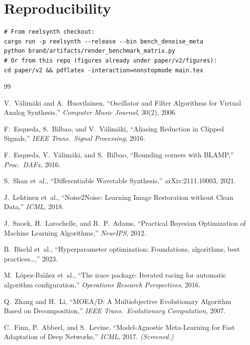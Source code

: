 \documentclass[11pt,a4paper]{article}
\begin{document}
\section*{Reproducibility}
\begin{verbatim}
# From reelsynth checkout:
cargo run -p reelsynth --release --bin bench_denoise_meta
python brand/artifacts/render_benchmark_matrix.py
# Or from this repo (figures already under paper/v2/figures):
cd paper/v2 && pdflatex -interaction=nonstopmode main.tex
\end{verbatim}

\begin{thebibliography}{99}

V.~V\"alim\"aki and A.~Huovilainen,
``Oscillator and Filter Algorithms for Virtual Analog Synthesis,''
\emph{Computer Music Journal}, 30(2), 2006.

F.~Esqueda, S.~Bilbao, and V.~V\"alim\"aki,
``Aliasing Reduction in Clipped Signals,''
\emph{IEEE Trans.\ Signal Processing}, 2016.

F.~Esqueda, V.~V\"alim\"aki, and S.~Bilbao,
``Rounding corners with BLAMP,''
\emph{Proc.\ DAFx}, 2016.

S.~Shan et~al.,
``Differentiable Wavetable Synthesis,''
arXiv:2111.10003, 2021.

J.~Lehtinen et~al.,
``Noise2Noise: Learning Image Restoration without Clean Data,''
\emph{ICML}, 2018.

J.~Snoek, H.~Larochelle, and R.~P.~Adams,
``Practical Bayesian Optimization of Machine Learning Algorithms,''
\emph{NeurIPS}, 2012.

B.~Bischl et~al.,
``Hyperparameter optimization: Foundations, algorithms, best practices\ldots,''
2023.

M.~L\'opez-Ib\'a\~nez et~al.,
``The irace package: Iterated racing for automatic algorithm configuration,''
\emph{Operations Research Perspectives}, 2016.

Q.~Zhang and H.~Li,
``MOEA/D: A Multiobjective Evolutionary Algorithm Based on Decomposition,''
\emph{IEEE Trans.\ Evolutionary Computation}, 2007.

C.~Finn, P.~Abbeel, and S.~Levine,
``Model-Agnostic Meta-Learning for Fast Adaptation of Deep Networks,''
\emph{ICML}, 2017.
\textit{(Screened.)}

\end{thebibliography}
\end{document}
